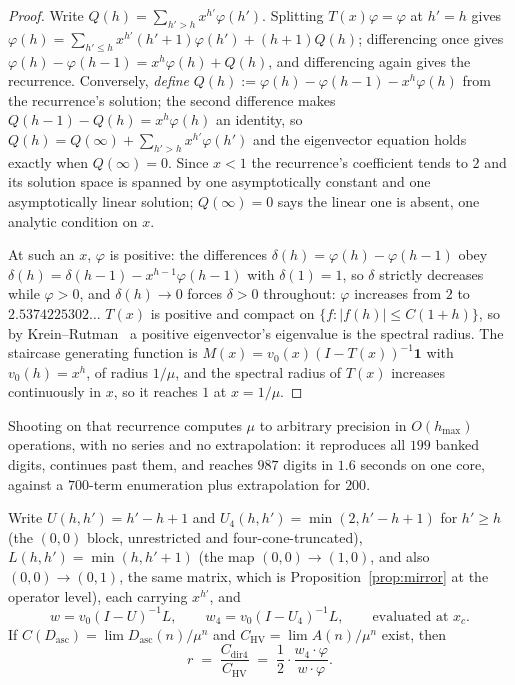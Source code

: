 \documentclass[11pt]{article}
\newcommand{\HV}{\mathrm{HV}}
\begin{document}
\begin{proof}
Write $Q(h) = \sum_{h'>h}x^{h'}\varphi(h')$. Splitting $T(x)\varphi = \varphi$
at $h' = h$ gives $\varphi(h) = \sum_{h'\le h}x^{h'}(h'{+}1)\varphi(h') +
(h{+}1)Q(h)$; differencing once gives
$\varphi(h)-\varphi(h{-}1) = x^h\varphi(h) + Q(h)$, and differencing again gives
the recurrence. Conversely, \emph{define}
$Q(h) := \varphi(h)-\varphi(h{-}1)-x^h\varphi(h)$ from the recurrence's
solution; the second difference makes $Q(h{-}1)-Q(h) = x^h\varphi(h)$ an
identity, so $Q(h) = Q(\infty) + \sum_{h'>h}x^{h'}\varphi(h')$ and the
eigenvector equation holds exactly when $Q(\infty) = 0$. Since $x < 1$ the
recurrence's coefficient tends to $2$ and its solution space is spanned by one
asymptotically constant and one asymptotically linear solution; $Q(\infty) = 0$
says the linear one is absent, one analytic condition on $x$.

At such an $x$, $\varphi$ is positive: the differences
$\delta(h) = \varphi(h)-\varphi(h{-}1)$ obey
$\delta(h) = \delta(h{-}1) - x^{h-1}\varphi(h{-}1)$ with $\delta(1) = 1$, so
$\delta$ strictly decreases while $\varphi > 0$, and $\delta(h) \to 0$ forces
$\delta > 0$ throughout: $\varphi$ increases from $2$ to $2.5374225302\dots$
$T(x)$ is positive and compact on $\{f : |f(h)| \le C(1+h)\}$, so by
Krein--Rutman~\cite{kreinRutman1948} a positive eigenvector's eigenvalue is the
spectral radius. The staircase generating function is
$M(x) = v_0(x)(I-T(x))^{-1}\mathbf 1$ with $v_0(h) = x^h$, of radius $1/\mu$,
and the spectral radius of $T(x)$ increases continuously in $x$, so it reaches
$1$ at $x = 1/\mu$.
\end{proof}

Shooting on that recurrence computes $\mu$ to arbitrary precision in
$O(h_{\max})$ operations, with no series and no extrapolation: it reproduces
all $199$ banked digits, continues past them, and reaches $987$ digits in
$1.6$ seconds on one core, against a $700$-term enumeration plus extrapolation
for $200$.

\begin{proposition}
\label{prop:ratio}
Write $U(h,h') = h'-h+1$ and $U_4(h,h') = \min(2, h'-h+1)$ for $h' \ge h$ (the
$(0,0)$ block, unrestricted and four-cone-truncated), $L(h,h') = \min(h,h'{+}1)$
(the map $(0,0)\to(1,0)$, and also $(0,0)\to(0,1)$, the same matrix, which is
Proposition~\ref{prop:mirror} at the operator level), each carrying $x^{h'}$,
and
\[
  w = v_0(I-U)^{-1}L, \qquad w_4 = v_0(I-U_4)^{-1}L,
  \qquad\text{evaluated at } x_c .
\]
If $C(D_{\mathrm{asc}}) = \lim D_{\mathrm{asc}}(n)/\mu^n$ and
$C_{\HV} = \lim A(n)/\mu^n$ exist, then
\begin{equation}
  r \;=\; \frac{C_{\text{dir4}}}{C_{\HV}}
    \;=\; \frac12\cdot\frac{w_4\cdot\varphi}{w\cdot\varphi} .
  \label{eq:ratio}
\end{equation}
\end{proposition}
\end{document}
